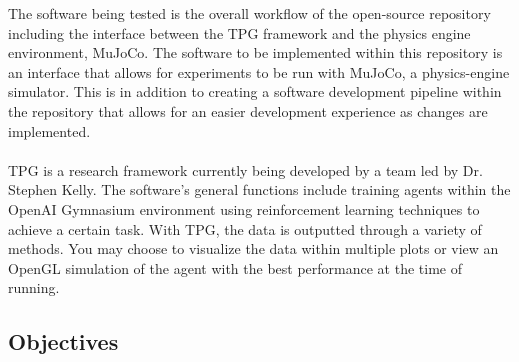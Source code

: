 \documentclass[12pt, titlepage]{article}
\begin{document}

The software being tested is the overall workflow of the open-source repository including the interface between the TPG framework and the physics engine environment, MuJoCo.
The software to be implemented within this repository is an interface that allows for experiments to be run with MuJoCo, a physics-engine simulator. This is in addition to creating a software development pipeline within the repository that allows for an easier development experience as changes are implemented. \\\\
TPG is a research framework currently being developed by a team led by Dr. Stephen Kelly. The software’s general functions include training agents within the OpenAI Gymnasium environment using reinforcement learning techniques to achieve a certain task. With TPG, the data is outputted through a variety of methods. You may choose to visualize the data within multiple plots or view an OpenGL simulation of the agent with the best performance at the time of running.

\subsection{Objectives}



\end{document}
